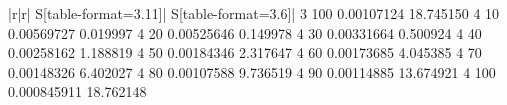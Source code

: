 \begin{table}
{\begin{minipage}{1.0\linewidth}
\begin{tabular}{|r|r|
S[table-format=3.11]|
S[table-format=3.6]|
}
\aLine
{3}
{100}
{0.00107124}
{18.745150}
\aLine
{4}
{10}
{0.00569727}
{0.019997}
\aLine
{4}
{20}
{0.00525646}
{0.149978}
\aLine
{4}
{30}
{0.00331664}
{0.500924}
\aLine
{4}
{40}
{0.00258162}
{1.188819}
\aLine
{4}
{50}
{0.00184346}
{2.317647}
\aLine
{4}
{60}
{0.00173685}
{4.045385}
\aLine
{4}
{70}
{0.00148326}
{6.402027}
\aLine
{4}
{80}
{0.00107588}
{9.736519}
\aLine
{4}
{90}
{0.00114885}
{13.674921}
\aLine
{4}
{100}
{0.000845911}
{18.762148}
\end{tabular}
\end{minipage}
}


  \label{tab:oneperinterp}
\end{table}
